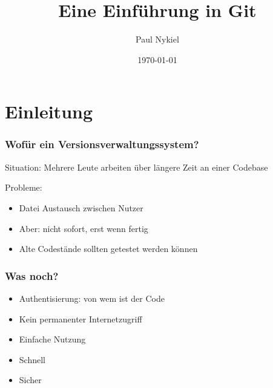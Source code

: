 \documentclass[aspectratio=169]{beamer}
\title{Eine Einführung in Git}
\author{Paul Nykiel}
\date{\today}
\begin{document}
\maketitle


\section{Einleitung}
\begin{frame}
    \frametitle{Wofür ein Versionsverwaltungssystem?}
    Situation: Mehrere Leute arbeiten über längere Zeit an einer Codebase

    \vspace{.5cm}

    \pause
    Probleme:
    \pause
    \begin{itemize}
        \item Datei Austausch zwischen Nutzer
            \pause
        \item Aber: nicht sofort, erst wenn fertig
            \pause
        \item Alte Codestände sollten getestet werden können
            \pause
    \end{itemize}
\end{frame}

\begin{frame}
    \frametitle{Was noch?}
    \begin{itemize}
        \item Authentisierung: von wem ist der Code
            \pause
        \item Kein permanenter Internetzugriff 
            \pause
        \item Einfache Nutzung
            \pause
        \item Schnell
            \pause
        \item Sicher
    \end{itemize}
\end{frame}
\end{document}
